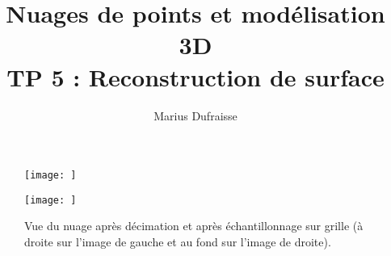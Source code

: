 \documentclass[french]{article}
\begin{document}
\title{Nuages de points et modélisation 3D\\
TP 5 : Reconstruction de surface}
\author{Marius Dufraisse}
\date{}

\maketitle




\begin{figure}[h]
	\centering
	\begin{minipage}{0.47\linewidth}
		\centering
		\texttt{[image: ]}
	\end{minipage}\hfill
	\begin{minipage}{0.47\linewidth}
		\centering
		\texttt{[image: ]}
	\end{minipage}
	\caption{Vue du nuage après décimation et après échantillonnage sur grille (à droite sur l'image de gauche et au fond sur l'image de droite).}
	\label{fig:q5}
\end{figure}
\end{document}
